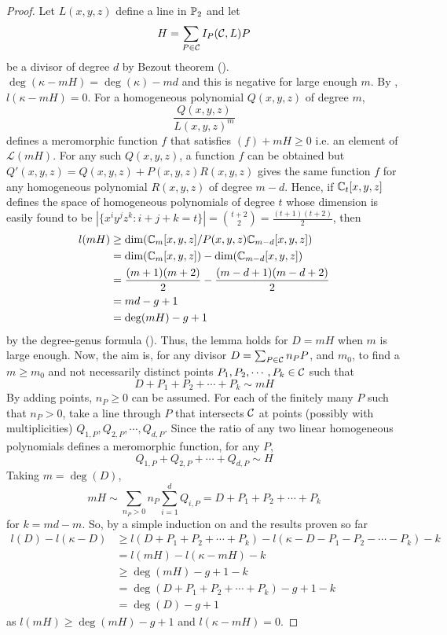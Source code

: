 \begin{proof}
    Let $L(x,y,z)$ define a line in $\mathbb P_2$ and let
    $$H=\sum_{P\in\mathcal C}I_P(\mathcal C,L)P$$
    be a divisor of degree $d$ by Bezout theorem (). $\deg(\kappa-mH)=\deg(\kappa)-md$ and this is negative for large enough $m$. By , $l(\kappa-mH)=0$. For a homogeneous polynomial $Q(x,y,z)$ of degree $m$,
    $$\frac{Q(x,y,z)}{L(x,y,z)^m}$$
    defines a meromorphic function $f$ that satisfies $(f)+mH\geq 0$ i.e. an element of $\mathcal{L}(mH)$. For any such $Q(x,y,z)$, a function $f$ can be obtained but $Q'(x,y,z)=Q(x,y,z)+P(x,y,z)R(x,y,z)$ gives the same function $f$ for any homogeneous polynomial $R(x,y,z)$ of degree $m-d$. Hence, if $\mathbb C_t[x,y,z]$ defines the space of homogeneous polynomials of degree $t$ whose dimension is easily found to be $|\{x^iy^jz^k:i+j+k=t\}|={t+2 \choose 2}=\frac{(t+1)(t+2)}{2}$, then
    \begin{align*}
        l(mH) &\geq \dim(\mathbb C_m[x,y,z]/P(x,y,z)\mathbb C_{m-d}[x,y,z])\\
        &= \dim(\mathbb C_m[x,y,z])-\dim(\mathbb C_{m-d}[x,y,z])\\
        &= \frac{(m+1)(m+2)}{2}-\frac{(m-d+1)(m-d+2)}{2}\\
        &= md-g+1\\
        &= \deg(mH)-g+1
    \end{align*}
    by the degree-genus formula (). Thus, the lemma holds for $D=mH$ when $m$ is large enough.
    Now, the aim is, for any divisor $D=\sum_{P\in\mathcal C}n_PP$, and $m_0$, to find a $m\geq m_0$ and not necessarily distinct points $P_1,P_2,\cdots,P_k\in\mathcal C$ such that 
    $$D+P_1+P_2+\cdots+P_k\sim mH$$
    By adding points, $n_P\geq 0$ can be assumed. For each of the finitely many $P$ such that $n_P>0$, take a line through $P$ that intersects $\mathcal C$ at points (possibly with multiplicities) $Q_{1,P},Q_{2,P},\cdots,Q_{d,P}$. Since the ratio of any two linear homogeneous polynomials defines a meromorphic function, for any $P$, $$Q_{1,P}+Q_{2,P}+\cdots+Q_{d,P}\sim H$$
    Taking $m=\deg(D)$,
    $$mH\sim \sum_{n_P>0}n_P\sum_{i=1}^dQ_{i,P}= D+P_1+P_2+\cdots+P_k$$
    for $k=md-m$. So, by a simple induction on  and the results proven so far
    \begin{align*}
        l(D)-l(\kappa-D) &\geq l(D+P_1+P_2+\cdots+P_k)-l(\kappa-D-P_1-P_2-\cdots-P_k)-k\\
        &= l(mH)-l(\kappa-mH)-k\\
        &\geq \deg(mH)-g+1-k\\
        &= \deg(D+P_1+P_2+\cdots+P_k)-g+1-k\\
        &= \deg(D)-g+1
    \end{align*}
    as $l(mH)\geq\deg(mH)-g+1$ and $l(\kappa-mH)=0$.
\end{proof}

